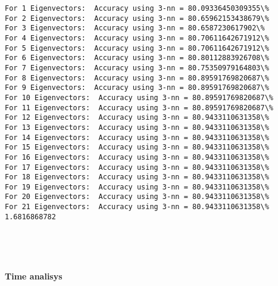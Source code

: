 \documentclass[11pt]{article}
\begin{document}
    \begin{Verbatim}[commandchars=\\\{\}]
For 1 Eigenvectors:  Accuracy using 3-nn = 80.09336450309355\%
For 2 Eigenvectors:  Accuracy using 3-nn = 80.65962153438679\%
For 3 Eigenvectors:  Accuracy using 3-nn = 80.6587230617902\%
For 4 Eigenvectors:  Accuracy using 3-nn = 80.70611642671912\%
For 5 Eigenvectors:  Accuracy using 3-nn = 80.70611642671912\%
For 6 Eigenvectors:  Accuracy using 3-nn = 80.80112883926708\%
For 7 Eigenvectors:  Accuracy using 3-nn = 80.75350979164803\%
For 8 Eigenvectors:  Accuracy using 3-nn = 80.89591769820687\%
For 9 Eigenvectors:  Accuracy using 3-nn = 80.89591769820687\%
For 10 Eigenvectors:  Accuracy using 3-nn = 80.89591769820687\%
For 11 Eigenvectors:  Accuracy using 3-nn = 80.89591769820687\%
For 12 Eigenvectors:  Accuracy using 3-nn = 80.9433110631358\%
For 13 Eigenvectors:  Accuracy using 3-nn = 80.9433110631358\%
For 14 Eigenvectors:  Accuracy using 3-nn = 80.9433110631358\%
For 15 Eigenvectors:  Accuracy using 3-nn = 80.9433110631358\%
For 16 Eigenvectors:  Accuracy using 3-nn = 80.9433110631358\%
For 17 Eigenvectors:  Accuracy using 3-nn = 80.9433110631358\%
For 18 Eigenvectors:  Accuracy using 3-nn = 80.9433110631358\%
For 19 Eigenvectors:  Accuracy using 3-nn = 80.9433110631358\%
For 20 Eigenvectors:  Accuracy using 3-nn = 80.9433110631358\%
For 21 Eigenvectors:  Accuracy using 3-nn = 80.9433110631358\%
1.6816868782

    \end{Verbatim}

    \begin{center}
    \end{center}
    { \hspace*{\fill} \\}
    
    \begin{center}
    \end{center}
    { \hspace*{\fill} \\}
    
    \textbf{Time analisys}
\end{document}
